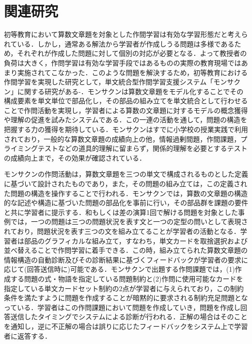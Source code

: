 \section{関連研究}

初等教育において算数文章題を対象とした作間学習は有効な学習形態だと考えられている．しかし，通常ある解法から学習者が作成しうる問題は多様であるため，それぞれが作成した問題に対して個別の対応が必要となる．よって教授者の負荷は大きく，作問学習は有効な学習手段ではあるものの実際の教育現場ではあまり実施されてこなかった\cite{nakano00}．このような問題を解決するため，初等教育における作間学習を実現した研究として，単文統合型作間学習支援システム「モンサクン」に関する研究がある\cite{yoko06}-\cite{yama13b}．モンサクンは算数文章題をモデル化することでその構成要素を単文単位で部品化し，その部品の組み立てを単文統合として行わせることで作問活動を実現し，学習者による算数の文章題に対するモデルの概念獲得や理解の促進を試みたシステムである．この一連の活動を通して，問題の構造を把握する力の獲得を期待している．モンサクンはすでに小学校の授業実践で利用されており，一般的な算数文章題の成績向上の他，情報過剰間題，作間課題，プライミングテストなどの道具的理解に留まらず，関係的理解を必要とするテストの成績向上まで，その効果が確認されている．

モンサクンの作問活動は，算数文章題を三つの単文で構成されるものとした定義に基づいて設計されたものであり，また，その問題の組み立ては，この定義された問題の構造を操作することで行われる．モンサクンでは，算数の文章題の構造的な記述や構造に基づいた問題の部品化を事前に行い，その部品群を課題の要件と共に学習者に提示する．和もしくは差の演算1回で解ける問題を対象とした事例では，一つの問題は三つの問題状況を表す文と一つの定型の問いとして表現されており，問題状況を表す三つの文を組み立てることが学習者の活動となる．学習者は部品のグラフィカルな組み立て，すなわち，単文カードを取捨選択および並べ替えることで作問学習に着手できる．この時，組み立てられた算数文章題の情報構造の自動診断及びその診断結果に基づくフィードバックが学習者の要求に応じて(回答送信時に)可能である．モンサクンで出題する作問課題では，(1)作成する問題の式・物語を指定している問題制約と(2)作問に使用可能なカードを指定している単文カードセット制約の2点が学習者に与えられており，この制約条件を満たすように問題を作成することが暗黙的に要求される制約充足問題となっている．学習者はこの作問課題において問題を作成していき，問題を作成し回答送信したタイミングでシステムによる診断が行われる．正解の場合はそのことを通知し，逆に不正解の場合は誤りに応じたフィードバックをシステム上で学習者に返答する．
